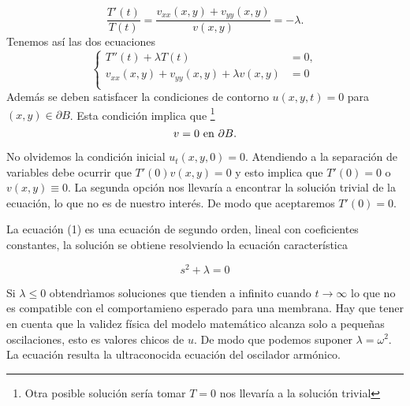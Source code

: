 \documentclass{article}
\begin{document}
 \[\frac{T'(t)}{T(t) }=\frac{v_{xx}(x,y)+v_{yy}(x,y)}{v(x,y)}=-\lambda.\]
Tenemos así las dos ecuaciones
\[
\left\{\begin{align}
  T''(t)+\lambda T(t)&=0,\\
  v_{xx}(x,y)+v_{yy}(x,y)+\lambda v(x,y)&=0\\
\end{align}
\right.
\]
Además se deben satisfacer la condiciones de contorno  $u(x,y,t)=0$ para  $(x,y)\in \partial B$. Esta condición implica que \footnote{Otra posible solución sería tomar  $T=0$ nos llevaría a la solución trivial}
\[ v=0 \hbox{ en } \partial B. \] 

No olvidemos  la condición inicial $u_t(x,y,0)=0$. Atendiendo a la separación de variables debe ocurrir que $T'(0)v(x,y)=0$ y esto implica que  $T'(0)=0$ o $v(x,y)\equiv 0$. La segunda opción nos llevaría a encontrar la solución trivial de la ecuación, lo que no es de nuestro interés. De modo que aceptaremos $T'(0)=0$.

La ecuación (1) es una ecuación de segundo orden, lineal con coeficientes constantes, la solución se obtiene resolviendo la ecuación característica

\[s^2+\lambda=0\]

Si $\lambda\leq 0$ obtendrìamos soluciones que tienden a infinito cuando $t\to\infty$ lo que no es compatible con el comportamieno esperado para una membrana. Hay que tener en cuenta que la validez física del modelo matemático alcanza solo a pequeñas oscilaciones, esto es valores chicos de $u$. De modo que podemos suponer $\lambda=\omega^2$. La ecuación resulta la ultraconocida ecuación del oscilador armónico. 
\end{document}
